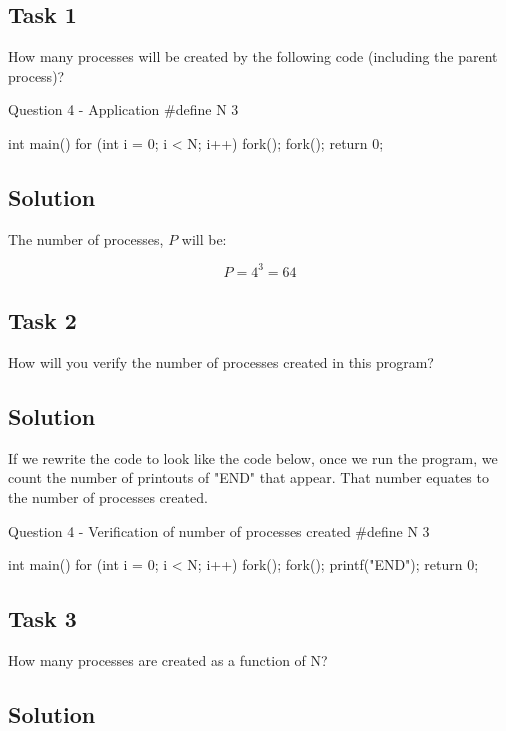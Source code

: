 \documentclass[../main.tex]{subfiles}
\begin{document}
\subsection{Task 1}

How many processes will be created by the following code (including the parent process)?

\begin{cppminted}{Question 4 - Application}
#define N 3

int main() {
    for (int i = 0; i < N; i++) {
        fork();
        fork();
    }
    return 0;
}
\end{cppminted}

\subsection*{Solution}

The number of processes, $P$ will be:

$$
    P = 4^3 = 64
$$

\subsection{Task 2}

How will you verify the number of processes created in this program?

\subsection*{Solution}

If we rewrite the code to look like the code below, once we run the program, we count the number of printouts of "END" that appear. That number equates to the number of processes created.

\begin{cppminted}{Question 4 - Verification of number of processes created}
#define N 3

int main() {
    for (int i = 0; i < N; i++) {
        fork();
        fork();
    }
    printf("END");
    return 0;
}
\end{cppminted}

\newpage

\subsection{Task 3}

How many processes are created as a function of N?

\subsection*{Solution}
\end{document}
